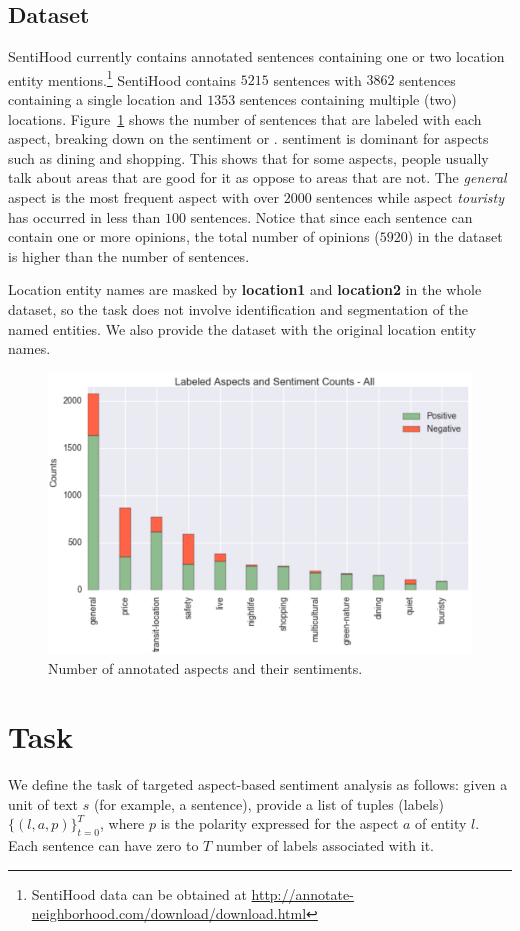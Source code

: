\documentclass[11pt]{article}
\begin{document}
        \subsection{Dataset}
        SentiHood currently contains annotated sentences containing one or two location entity mentions.\footnote{SentiHood data can be obtained at \url{http://annotate-neighborhood.com/download/download.html}} SentiHood contains $5215$ sentences with $3862$ sentences containing a single location and $1353$ sentences containing multiple (two) locations. Figure~\ref{fig:sentihood_stat} shows the number of sentences that are labeled with each aspect, breaking down on the sentiment  or .  sentiment is dominant for aspects such as dining and shopping. This shows that for some aspects, people usually talk about areas that are good for it as oppose to areas that are not. The \textit{general} aspect is the most frequent aspect with over $2000$ sentences while aspect \textit{touristy} has occurred in less than $100$ sentences. Notice that since each sentence can contain one or more opinions, the total number of opinions ($5920$) in the dataset is higher than the number of sentences.
        
        Location entity names are masked by \textbf{location1} and \textbf{location2} in the whole dataset, so the task does not involve identification and segmentation of the named entities. We also provide the dataset with the original location entity names. 
        \begin{figure}[ht]
          \centering
              \includegraphics[width=.8\linewidth]{figures/multi_single.pdf}
          \caption{Number of annotated aspects and their sentiments.}
          \label{fig:sentihood_stat}
        \end{figure}
\section{Task}
        We define the task of targeted aspect-based sentiment analysis as follows: given a unit of text $s$ (for example, a sentence), provide a list of tuples (labels) $\{(l, a, p)\}_{t = 0}^{T}$, where $p$ is the polarity expressed for the aspect $a$ of entity $l$. Each sentence can have zero to $T$ number of labels associated with it.
        
\end{document}
